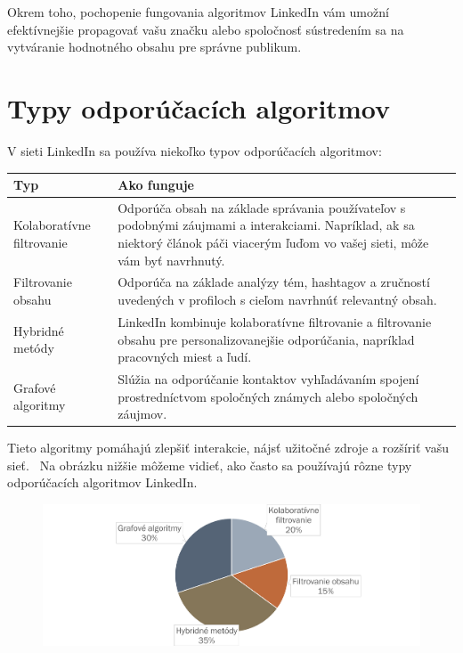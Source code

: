 \documentclass[slovak,a4paper]{coursepaper}
\begin{document}
Okrem toho, pochopenie fungovania algoritmov LinkedIn vám umožní efektívnejšie propagovať vašu značku alebo spoločnosť sústredením sa na vytváranie hodnotného obsahu pre správne publikum.

\newpage
\section{Typy odporúčacích algoritmov} \label{Typy}
V sieti LinkedIn sa používa niekoľko typov odporúčacích algoritmov:


\begin{table}[h!]
    \begin{tabularx}{\textwidth}{|>{\centering\arraybackslash}l|X|}
        \hline
        \textbf{Typ} & \textbf{Ako funguje} 
		\\ \hline Kolaboratívne filtrovanie & Odporúča obsah na základe správania používateľov 
		s podobnými záujmami a interakciami. Napríklad, ak sa niektorý článok páči viacerým ľuďom vo vašej sieti, môže vám byť navrhnutý.

		\\ \hline Filtrovanie obsahu & Odporúča na základe analýzy tém, hashtagov a zručností uvedených v profiloch s cieľom navrhnúť relevantný obsah.  
		\\ \hline Hybridné metódy & LinkedIn kombinuje kolaboratívne filtrovanie a filtrovanie obsahu pre personalizovanejšie odporúčania, napríklad pracovných miest a ľudí.
		\\ \hline Grafové algoritmy & Slúžia na odporúčanie kontaktov vyhľadávaním spojení prostredníctvom spoločných známych alebo spoločných záujmov.
		\\ \hline
    \end{tabularx}
    \label{tab:typy}
\end{table}

Tieto algoritmy pomáhajú zlepšiť interakcie, nájsť užitočné zdroje a rozšíriť vašu sieť.~\cite{3} Na obrázku nižšie môžeme vidieť, ako často sa používajú rôzne typy odporúčacích algoritmov LinkedIn.

\begin{figure}[H]
	\hspace*{-3cm}
	\includegraphics[width=1.4\textwidth]{graph.png}
\end{figure}
\end{document}
